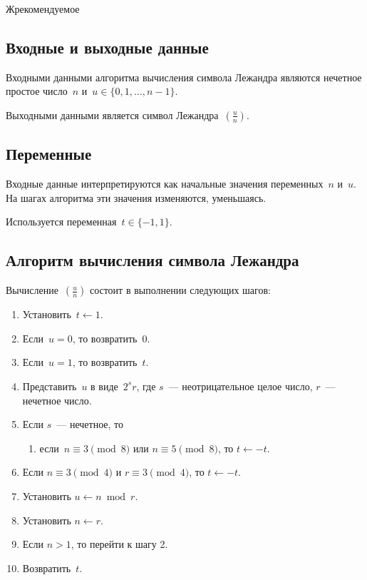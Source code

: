 \begin{appendix}{Ж}{рекомендуемое}
\subsection{Входные и выходные данные}\label{NT.Legendre.InOut}

Входными данными алгоритма вычисления символа Лежандра
являются нечетное простое число~$n$ и~$u\in\{0,1,\ldots,n-1\}$.

Выходными данными является символ Лежандра~$\left(\frac{u}{n}\right)$.

\subsection{Переменные}\label{NT.Legendre.Vars}

Входные данные интерпретируются как начальные
значения переменных~$n$ и~$u$.
На шагах алгоритма эти значения изменяются, уменьшаясь.

Используется переменная~$t\in\{-1,1\}$.

\subsection{Алгоритм вычисления символа Лежандра}\label{NT.Legendre.Alg}

Вычисление~$\left(\frac{u}{n}\right)$ 
состоит в выполнении следующих шагов:
\begin{enumerate}
\item
Установить~$t\leftarrow 1$.

\item
Если~$u=0$, то возвратить~$0$.

\item
Если~$u=1$, то возвратить~$t$.

\item
Представить~$u$ в виде~$2^s r$, 
где $s$~--- неотрицательное целое число, 
$r$~--- нечетное число.

\item
Если $s$~--- нечетное, то
\begin{enumerate} 
\item
если~$n\equiv 3\pmod{8}$ или $n\equiv 5\pmod{8}$, 
то $t\leftarrow -t$.
\end{enumerate} 

\item
Если $n\equiv 3\pmod{4}$ и $r\equiv 3\pmod{4}$, 
то $t\leftarrow -t$.

\item
Установить $u\leftarrow n\bmod r$.

\item
Установить $n\leftarrow r$.

\item
Если $n>1$, то перейти к шагу 2.

\item
Возвратить~$t$.
\end{enumerate}

\end{appendix}
